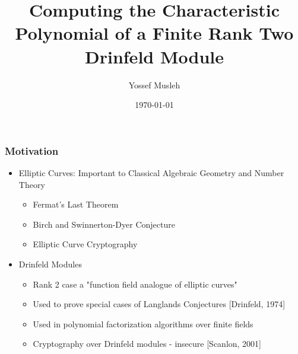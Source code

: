 \documentclass{beamer}
\title[]{Computing the Characteristic Polynomial of a Finite Rank Two Drinfeld Module} %
\author{Yossef Musleh} %
\institute[UW] %
{
University of Waterloo \\ %
\medskip
\textit{ymusleh@uwaterloo.ca} %
}
\date{\today} %
\begin{document}
\begin{frame}
\titlepage %
\end{frame}



\begin{frame}
\frametitle{Motivation}

\begin{itemize}

\item  Elliptic Curves: Important to Classical Algebraic Geometry and Number Theory

\begin{itemize}
    \item Fermat's Last Theorem
    \item Birch and Swinnerton-Dyer Conjecture
    \item Elliptic Curve Cryptography
    
\end{itemize}

\item Drinfeld Modules
\begin{itemize}
\item Rank 2 case a "function field analogue of elliptic curves"
    \item Used to prove special cases of Langlands Conjectures [Drinfeld, 1974]
    \item Used in polynomial factorization algorithms over finite fields
    
 
    \item Cryptography over Drinfeld modules - insecure [Scanlon, 2001]
\end{itemize}
  
  
  
  
\end{itemize}

\end{frame}
\end{document}

